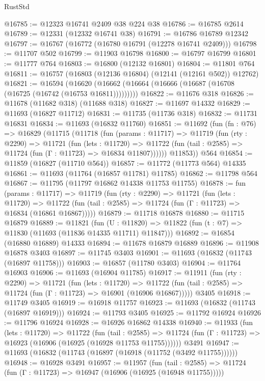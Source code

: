 \begin{lexlean}{RustStd}
\begin{coremodule}
@16785 := @12323 @16741 @2409 @38 @224 @38
@16786 := @16785 @2614
@16789 := @12331 (@12332 @16741 @38)
@16791 := @16786 @16789 @12342
@16797 := @16767 (@16772 (@16780 @16791 (@12278 @16741 @2409)))
@16798 := @11707 @502
@16799 := @11903 @16798
@16800 := @16797 @16799
@16801 := @11777 @764
@16803 := @16800 (@12132 @16801)
@16804 := @11801 @764
@16811 := @16757 (@16803 (@12136 @16804) (@12141 (@12161 @502)) @12762)
@16821 := @16594
    (@16620 (@16662 (@16664 (@16666 (@16687 (@16708 (@16725 (@16742 (@16753 @16811)))))))))
@16822 := @11676 @318
@16826 := @11678 (@11682 @318) (@11688 @318)
@16827 := @11697 @14332
@16829 := @11693 (@16827 @11712)
@16831 := @11735 (@11736 @318)
@16832 := @11731 @16831
@16834 := @11693 (@16832 @11760)
@16851 := @11692
    (fun (fn : @76) =>
    @16829
      (@11715
        (@11718
          (fun (params : @11717) =>
          @11719
            (fun (rty : @2290) =>
            @11721
              (fun (lets : @11720) =>
              @11722 (fun (tail : @2585) => @11724 (fun (Γ : @11723) => @16834 @11807))))))
        @11853))
    @564
@16854 := @11859 (@16827 (@11710 @564))
@16857 := @11772 (@11773 @564) @14335
@16861 := @11693 (@11764 (@16857 @11781) @11785)
@16862 := @11798 @564
@16867 := @11795 (@11797 @16862 @14338 @11753 @11755)
@16878 := fun (params : @11717) =>
  @11719
    (fun (rty : @2290) =>
    @11721
      (fun (lets : @11720) =>
      @11722 (fun (tail : @2585) => @11724 (fun (Γ : @11723) => @16834 (@16861 @16867)))))
@16879 := @11718 @16878
@16880 := @11715 @16879
@16889 := @11821
    (fun (U : @11820) => @11822 (fun (t : @7) => @11830 (@11693 (@11836 @14335 @11711) @11847)))
@16892 := @16854 (@16880 @16889) @14333
@16894 := @11678 @16879 @16889
@16896 := @11908 @16878 @3403
@16897 := @11745 @3403
@16901 := @11693 (@16832 (@11743 (@16897 @11758)))
@16903 := @16857 (@11780 @3403)
@16904 := @11764 @16903
@16906 := @11693 (@16904 @11785)
@16917 := @11911
    (fun (rty : @2290) =>
    @11721
      (fun (lets : @11720) =>
      @11722 (fun (tail : @2585) => @11724 (fun (Γ : @11723) => @16901 (@16906 @16867)))))
    @3405
@16918 := @11749 @3405
@16919 := @16918 @11757
@16923 := @11693 (@16832 (@11743 (@16897 @16919)))
@16924 := @11793 @3405
@16925 := @11792 @16924
@16926 := @11796 @16924
@16928 := @16926 @16862 @14338
@16940 := @11933
    (fun (lets : @11720) =>
    @11722
      (fun (tail : @2585) =>
      @11724 (fun (Γ : @11723) => @16923 (@16906 (@16925 (@16928 @11753 @11755))))))
    @3491
@16947 := @11693 (@16832 (@11743 (@16897 (@16918 (@11752 (@3492 @11755))))))
@16948 := @16928 @3491
@16957 := @11957
    (fun (tail : @2585) => @11724 (fun (Γ : @11723) => @16947 (@16906 (@16925 (@16948 @11755)))))

\end{coremodule}
\end{lexlean}
